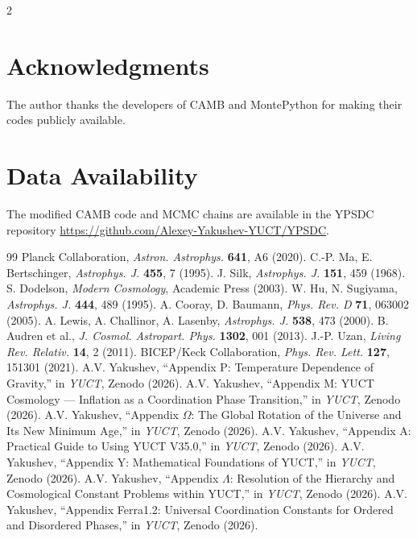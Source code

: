 \documentclass[11pt,a4paper]{article}
\begin{document}
\begin{multicols}{2}
		\section*{Acknowledgments}
		
		The author thanks the developers of CAMB and MontePython for making their codes publicly available.
		
		\section*{Data Availability}
		
		The modified CAMB code and MCMC chains are available in the YPSDC repository \url{https://github.com/Alexey-Yakushev-YUCT/YPSDC}.
		
		\begin{thebibliography}{99}
			 Planck Collaboration, \emph{Astron. Astrophys.} \textbf{641}, A6 (2020).
			 C.-P. Ma, E. Bertschinger, \emph{Astrophys. J.} \textbf{455}, 7 (1995).
			 J. Silk, \emph{Astrophys. J.} \textbf{151}, 459 (1968).
			 S. Dodelson, \emph{Modern Cosmology}, Academic Press (2003).
			 W. Hu, N. Sugiyama, \emph{Astrophys. J.} \textbf{444}, 489 (1995).
			 A. Cooray, D. Baumann, \emph{Phys. Rev. D} \textbf{71}, 063002 (2005).
			 A. Lewis, A. Challinor, A. Lasenby, \emph{Astrophys. J.} \textbf{538}, 473 (2000).
			 B. Audren et al., \emph{J. Cosmol. Astropart. Phys.} \textbf{1302}, 001 (2013).
			 J.-P. Uzan, \emph{Living Rev. Relativ.} \textbf{14}, 2 (2011).
			 BICEP/Keck Collaboration, \emph{Phys. Rev. Lett.} \textbf{127}, 151301 (2021).
			 A.V. Yakushev, ``Appendix P: Temperature Dependence of Gravity,'' in \emph{YUCT}, Zenodo (2026).
			 A.V. Yakushev, ``Appendix M: YUCT Cosmology — Inflation as a Coordination Phase Transition,'' in \emph{YUCT}, Zenodo (2026).
			 A.V. Yakushev, ``Appendix $\Omega$: The Global Rotation of the Universe and Its New Minimum Age,'' in \emph{YUCT}, Zenodo (2026).
			 A.V. Yakushev, ``Appendix A: Practical Guide to Using YUCT V35.0,'' in \emph{YUCT}, Zenodo (2026).
			 A.V. Yakushev, ``Appendix Y: Mathematical Foundations of YUCT,'' in \emph{YUCT}, Zenodo (2026).
			 A.V. Yakushev, ``Appendix $\Lambda$: Resolution of the Hierarchy and Cosmological Constant Problems within YUCT,'' in \emph{YUCT}, Zenodo (2026).
			 A.V. Yakushev, ``Appendix Ferra1.2: Universal Coordination Constants for Ordered and Disordered Phases,'' in \emph{YUCT}, Zenodo (2026).
		\end{thebibliography}
		
	\end{multicols}
\end{document}
